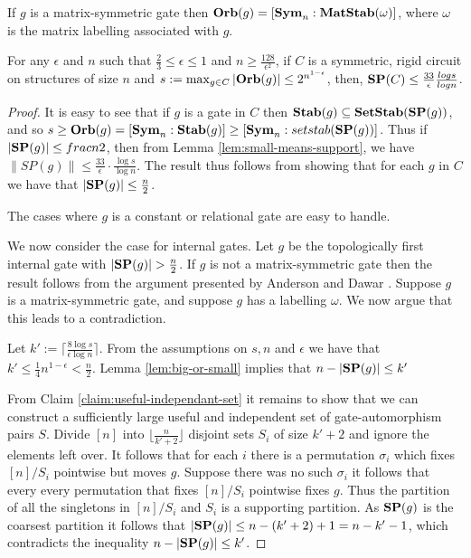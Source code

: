 \documentclass[../paper.tex]{subfiles}
\begin{document}
If $g$ is a matrix-symmetric gate then $\text{\textbf{Orb}}(g) = [\text{\textbf{Sym}}_n:\text{\textbf{MatStab}} (\omega)]$,
where $\omega$ is the matrix labelling associated with $g$.



\begin{thm}
  \label{thm:support_thm}
  For any $\epsilon$ and $n$ such that $\frac{2}{3} \leq \epsilon \leq 1$ and $n
  \geq \frac{128}{\epsilon^2}$, if $C$ is a symmetric, rigid circuit on
  structures of size $n$ and $s := \max_{g \in C} \vert \text{\textbf{Orb}} (g)\vert \leq
  2^{n^{1-\epsilon}}$, then, $\text{\textbf{SP}}(C) \leq \frac{33}{\epsilon}\frac{log s}{log
    n}$.
\end{thm}

\begin{proof}
  It is easy to see that if $g$ is a gate in $C$ then $\text{\textbf{Stab}} (g) \subseteq
  \text{\textbf{SetStab}}(\text{\textbf{SP}}(g))$, and so $s \geq \text{\textbf{Orb}}(g) = [\text{\textbf{Sym}}_n : \text{\textbf{Stab}}(g)] \geq [\text{\textbf{Sym}}_n :
  setstab(\text{\textbf{SP}}(g))]$. Thus if $\vert \text{\textbf{SP}}(g) \vert \leq frac{n}{2}$, then from
  Lemma \ref{lem:small-means-support}, we have $\| SP (g) \| \leq
  \frac{33}{\epsilon} \cdot \frac{\log s} {\log n}$. The result thus follows
  from showing that for each $g$ in $C$ we have that $\vert \text{\textbf{SP}} (g) \vert \leq
  \frac{n}{2}$.
  
  The cases where $g$ is a constant or relational gate are easy to handle.

  We now consider the case for internal gates. Let $g$ be the topologically
  first internal gate with $\vert \text{\textbf{SP}}(g) \vert > \frac{n}{2}$. If $g$ is not a
  matrix-symmetric gate then the result follows from the argument presented by
  Anderson and Dawar \cite{AndersonD17}. Suppose $g$ is a matrix-symmetric gate,
  and suppose $g$ has a labelling $\omega$. We now argue that this leads to a
  contradiction.

  Let $k' := \lceil \frac{8 \log s}{\epsilon \log n} \rceil$. From the
  assumptions on $s, n$ and $\epsilon$ we have that $k' \leq
  \frac{1}{4}n^{1-\epsilon} < \frac{n}{2}$. Lemma \ref{lem:big-or-small} implies
  that $n - \vert \text{\textbf{SP}}(g) \vert \leq k'$
  
  From Claim \ref{claim:useful-independant-set} it remains to show that we can
  construct a sufficiently large useful and independent set of gate-automorphism
  pairs $S$. Divide $[n]$ into $\lfloor \frac{n}{k' + 2} \rfloor$ disjoint sets
  $S_i$ of size $k' + 2$ and ignore the elements left over. It follows that for
  each $i$ there is a permutation $\sigma_i$ which fixes $[n] / S_i$ pointwise
  but moves $g$. Suppose there was no such $\sigma_i$ it follows that every
  every permutation that fixes $[n]/S_i$ pointwise fixes $g$. Thus the partition
  of all the singletons in $[n]/S_i$ and $S_i$ is a supporting partition. As
  $\text{\textbf{SP}}(g)$ is the coarsest partition it follows that $\vert \text{\textbf{SP}}(g) \vert \leq n
  - (k'+2) + 1 = n - k' - 1$, which contradicts the inequality $n - \vert \text{\textbf{SP}}(g)
  \vert \leq k'$.


\end{proof}
\end{document}
